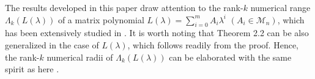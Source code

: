 \documentclass[12pt, reqno]{amsart}
\theoremstyle{definition}
\theoremstyle{remark}
\numberwithin{equation}{section}
\begin{document}
\par
The results developed in this paper draw attention to the rank-$k$ nume\-rical range $\Lambda_{k}(L(\lambda))$ of a matrix polynomial  $L(\lambda)=\sum_{i=0}^{m}A_{i}\lambda^{i}$ $(A_{i}\in\mathcal{M}_{n})$, which has been  extensively studied in \cite{Aretaki,Aret}. It is worth noting that Theorem 2.2 can be also gene\-ralized in the case of $L(\lambda)$, which follows readily from the proof. Hence,  the rank-$k$ numerical radii of $\Lambda_{k}(L(\lambda))$ can be elaborated with the same spirit as here \cite{Adam}.



\appendix
\section{\null}
\end{document}
